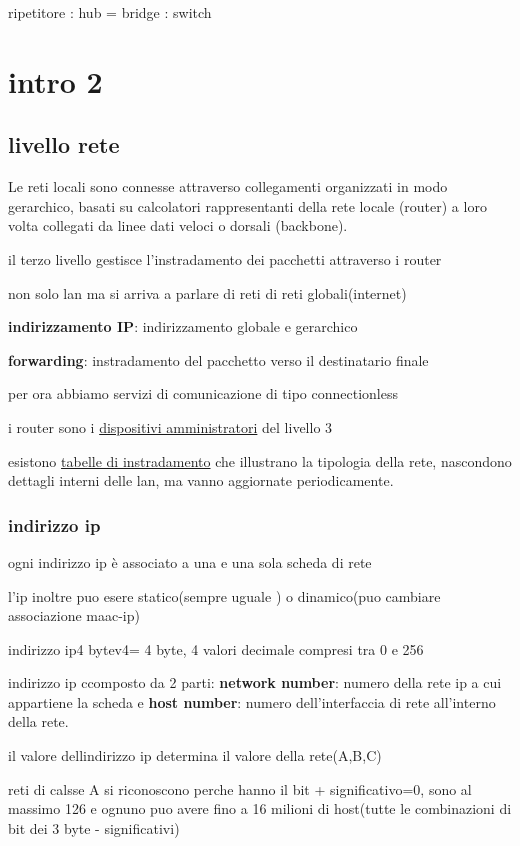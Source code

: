 \documentclass[12pt]{article}
\begin{document}
ripetitore : hub = bridge : switch

\section{intro 2}

\subsection{livello rete}

Le reti locali sono connesse attraverso collegamenti organizzati in modo gerarchico, basati su
calcolatori rappresentanti della rete locale (router) a loro volta collegati da linee dati veloci o
dorsali (backbone).

il terzo livello gestisce l'instradamento dei pacchetti attraverso i router

non solo lan ma si arriva a parlare di reti di reti globali(internet)

\textbf{indirizzamento IP}: indirizzamento globale e gerarchico

\textbf{forwarding}: instradamento del pacchetto verso il destinatario finale

per ora abbiamo servizi di comunicazione di tipo connectionless

i router sono i \underline{dispositivi amministratori} del livello 3

esistono \underline{tabelle di instradamento} che illustrano la tipologia della rete, nascondono dettagli interni delle lan,
ma vanno aggiornate periodicamente.
\\
\subsubsection{indirizzo ip}
ogni indirizzo ip è associato a una e una sola scheda di rete

l'ip inoltre puo esere statico(sempre uguale ) o dinamico(puo cambiare associazione maac-ip)

indirizzo ip4 bytev4= 4 byte, 4 valori decimale compresi tra 0 e 256

indirizzo ip ccomposto da 2 parti: \textbf{network number}: numero della rete ip a cui appartiene la scheda
e \textbf{host number}: numero dell'interfaccia di rete all'interno della rete.

il valore dellindirizzo ip determina il valore della rete(A,B,C)

reti di calsse A si riconoscono perche hanno il bit + significativo=0, sono al massimo 126  e ognuno puo avere fino a 16 milioni di host(tutte le combinazioni di bit dei 3 byte - significativi)
\end{document}
